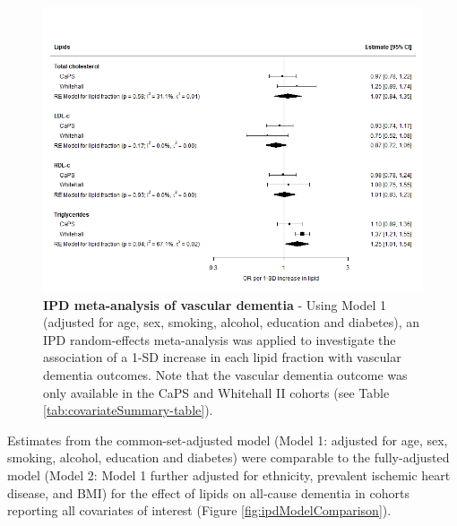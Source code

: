 \documentclass[a4paper, twoside]{templates/ociamthesis}
\begin{document}
\begin{figure}[H]
\includegraphics[width=1\linewidth]{figures/ipd/main_vasdem} \caption[IPD meta-analysis of vascular dementia]{\textbf{IPD meta-analysis of vascular dementia} - Using Model 1 (adjusted for age, sex, smoking, alcohol, education and diabetes), an IPD random-effects meta-analysis was applied to investigate the association of a 1-SD increase in each lipid fraction with vascular dementia outcomes. Note that the vascular dementia outcome was only available in the CaPS and Whitehall II cohorts (see Table \ref{tab:covariateSummary-table}).}\label{fig:mainEffectVad}
\end{figure}

Estimates from the common-set-adjusted model (Model 1: adjusted for age, sex, smoking, alcohol, education and diabetes) were comparable to the fully-adjusted model (Model 2: Model 1 further adjusted for ethnicity, prevalent ischemic heart disease, and BMI) for the effect of lipids on all-cause dementia in cohorts reporting all covariates of interest (Figure \ref{fig:ipdModelComparison}).
\end{document}
